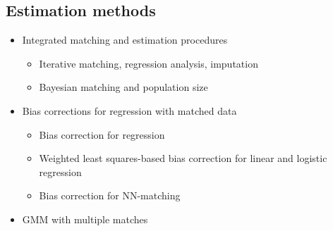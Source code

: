 \documentclass[12pt]{article}
\begin{document}
\subsection*{Estimation methods}
\begin{itemize}
\item Integrated matching and estimation procedures 
\begin{itemize}
\item Iterative matching, regression analysis, imputation \citep{sw1997}
\item  Bayesian matching and population size \citep{tancredi_liseo_2015}
\end{itemize}
\item Bias corrections for regression with matched data 
\begin{itemize}
\item Bias correction for regression \citep{sw1993, lahiri05} 
\item Weighted least squares-based bias correction for linear and logistic regression \citep{hof2012}
\item Bias correction for NN-matching \citep{hirukawa2018}
\end{itemize}
\item GMM with multiple matches \citep{ahl2019}
\end{itemize}


\newpage
\singlespacing
 

\end{document}
